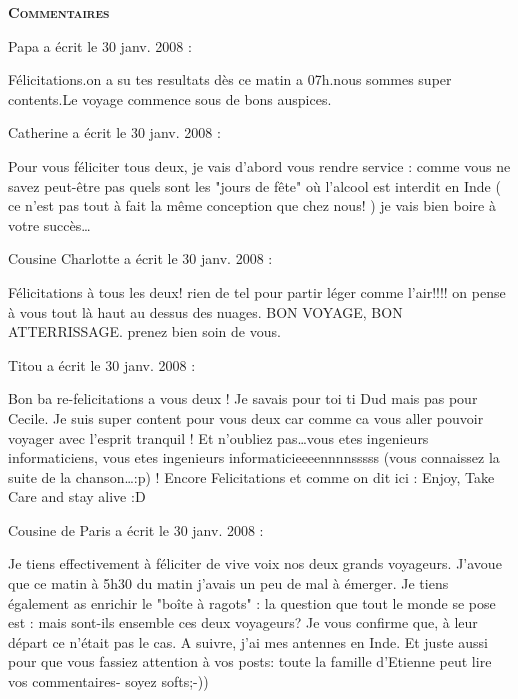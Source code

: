 \bigskip
\textbf{\textsc{Commentaires}}

\medskip
Papa a écrit le 30 janv. 2008 :
\begin{displayquote}
Félicitations.on a su tes resultats dès ce matin a 07h.nous sommes super contents.Le voyage commence sous de bons auspices.
\end{displayquote}

\medskip
Catherine a écrit le 30 janv. 2008 :
\begin{displayquote}
Pour vous féliciter tous deux, je vais d'abord vous rendre service : comme vous ne savez peut-être pas quels sont les "jours de fête" où l'alcool est interdit en Inde ( ce n'est pas tout à fait la même conception que chez nous! ) je vais bien boire à votre succès\dots
\end{displayquote}

\medskip
Cousine Charlotte a écrit le 30 janv. 2008 :
\begin{displayquote}
Félicitations à tous les deux! rien de tel pour partir léger comme l'air!!!! on pense à vous tout là haut au dessus des nuages. BON VOYAGE, BON ATTERRISSAGE. prenez bien soin de vous.
\end{displayquote}

\medskip
Titou a écrit le 30 janv. 2008 :
\begin{displayquote}
Bon ba re-felicitations a vous deux ! Je savais pour toi ti Dud mais pas pour Cecile. Je suis super content pour vous deux car comme ca vous aller pouvoir voyager avec l'esprit tranquil ! Et n'oubliez pas\dots vous etes ingenieurs informaticiens, vous etes ingenieurs informaticieeeennnnsssss (vous connaissez la suite de la chanson\dots :p) ! Encore Felicitations et comme on dit ici : Enjoy, Take Care and stay alive :D
\end{displayquote}

\medskip
Cousine de Paris a écrit le 30 janv. 2008 :
\begin{displayquote}
Je tiens effectivement à féliciter de vive voix nos deux grands voyageurs. J'avoue que ce matin à 5h30 du matin j'avais un peu de mal à émerger.
Je tiens également as enrichir le "boîte à ragots" : la question que tout le monde se pose est : mais sont-ils ensemble ces deux voyageurs? Je vous confirme que, à leur départ ce n'était pas le cas. A suivre, j'ai mes antennes en Inde.
Et juste aussi pour que vous fassiez attention à vos posts: toute la famille d'Etienne peut lire vos commentaires- soyez softs;-))
\end{displayquote}

